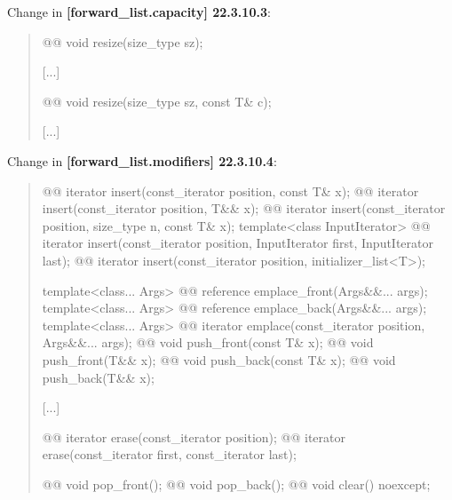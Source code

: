 \documentclass{wg21}
\begin{document}
Change in \textbf{[forward_list.capacity] 22.3.10.3}:
\begin{quote}
\begin{itemdecl}
@@ void resize(size_type sz);
\end{itemdecl}
[...]
\begin{itemdecl}
@@ void resize(size_type sz, const T& c);
\end{itemdecl}
[...]
\end{quote}

Change in \textbf{[forward_list.modifiers] 22.3.10.4}:
\begin{quote}
\begin{itemdecl}
@@ iterator insert(const_iterator position, const T& x);
@@ iterator insert(const_iterator position, T&& x);
@@ iterator insert(const_iterator position, size_type n, const T& x);
template<class InputIterator>
  @@ iterator insert(const_iterator position, InputIterator first, InputIterator last);
@@ iterator insert(const_iterator position, initializer_list<T>);

template<class... Args> @@ reference emplace_front(Args&&... args);
template<class... Args> @@ reference emplace_back(Args&&... args);
template<class... Args> @@ iterator emplace(const_iterator position, Args&&... args);
@@ void push_front(const T& x);
@@ void push_front(T&& x);
@@ void push_back(const T& x);
@@ void push_back(T&& x);
\end{itemdecl}
[...]
\begin{itemdecl}
@@ iterator erase(const_iterator position);
@@ iterator erase(const_iterator first, const_iterator last);

@@ void pop_front();
@@ void pop_back();
@@ void clear() noexcept;
\end{itemdecl}
\end{quote}
\end{document}
